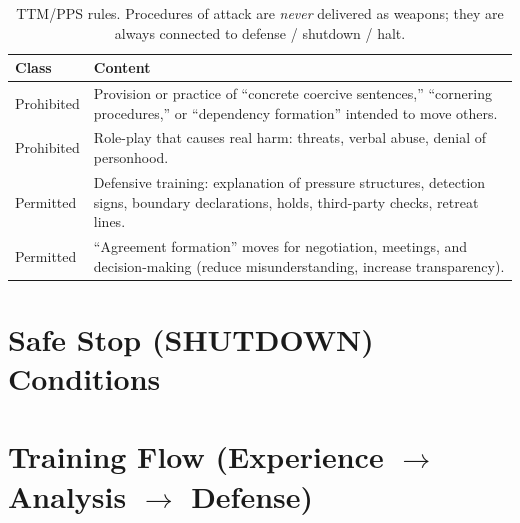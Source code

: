 \begin{table}[ht]
\centering
\small
\begin{tabularx}{\linewidth}{lX}
\toprule
\textbf{Class} & \textbf{Content} \\
\midrule
Prohibited & Provision or practice of ``concrete coercive
sentences,'' ``cornering procedures,'' or ``dependency formation''
intended to move others. \\
Prohibited & Role-play that causes real harm: threats, verbal abuse,
denial of personhood. \\
Permitted & Defensive training: explanation of pressure structures,
detection signs, boundary declarations, holds, third-party checks,
retreat lines. \\
Permitted & ``Agreement formation'' moves for negotiation, meetings,
and decision-making (reduce misunderstanding, increase transparency). \\
\bottomrule
\end{tabularx}
\caption[TTM/PPS rules]{TTM/PPS rules. Procedures of attack are
\emph{never} delivered as weapons; they are always connected to
defense / shutdown / halt.}
\label{tab:ttm-rules}
\end{table}

\section{Safe Stop (SHUTDOWN) Conditions}
\label{sec:ttm-shutdown}


\section{Training Flow (Experience $\to$ Analysis $\to$ Defense)}
\label{sec:ttm-flow}

